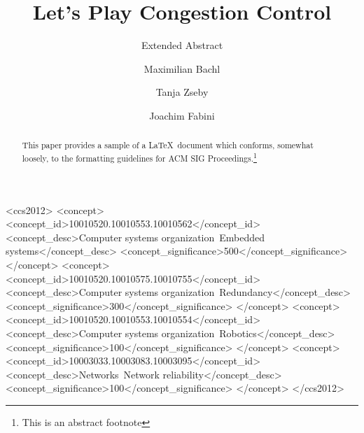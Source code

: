 \documentclass[sigconf]{acmart}
\begin{document}
\title{Let's Play Congestion Control}
\subtitle{Extended Abstract}

\author{Maximilian Bachl} 

\author{Tanja Zseby} 

\author{Joachim Fabini} 

\renewcommand{\shortauthors}{Bachl, Zseby, Fabini}

\begin{abstract}
This paper provides a sample of a \LaTeX\ document which conforms,
somewhat loosely, to the formatting guidelines for
ACM SIG Proceedings.\footnote{This is an abstract footnote}
\end{abstract}

%
%
\begin{CCSXML}
<ccs2012>
 <concept>
  <concept_id>10010520.10010553.10010562</concept_id>
  <concept_desc>Computer systems organization~Embedded systems</concept_desc>
  <concept_significance>500</concept_significance>
 </concept>
 <concept>
  <concept_id>10010520.10010575.10010755</concept_id>
  <concept_desc>Computer systems organization~Redundancy</concept_desc>
  <concept_significance>300</concept_significance>
 </concept>
 <concept>
  <concept_id>10010520.10010553.10010554</concept_id>
  <concept_desc>Computer systems organization~Robotics</concept_desc>
  <concept_significance>100</concept_significance>
 </concept>
 <concept>
  <concept_id>10003033.10003083.10003095</concept_id>
  <concept_desc>Networks~Network reliability</concept_desc>
  <concept_significance>100</concept_significance>
 </concept>
</ccs2012>  
\end{CCSXML}
\end{document}
